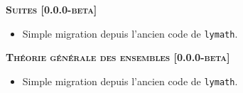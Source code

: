 \begin{center}
    \textbf{\textsc{Suites [0.0.0-beta]}}
\end{center}

\begin{itemize}[itemsep=.5em]
    \item Simple migration depuis l'ancien code de \verb+lymath+.
\end{itemize}


\separation




\begin{center}
    \textbf{\textsc{Théorie générale des ensembles [0.0.0-beta]}}
\end{center}

\begin{itemize}[itemsep=.5em]
    \item Simple migration depuis l'ancien code de \verb+lymath+.
\end{itemize}


\separation
